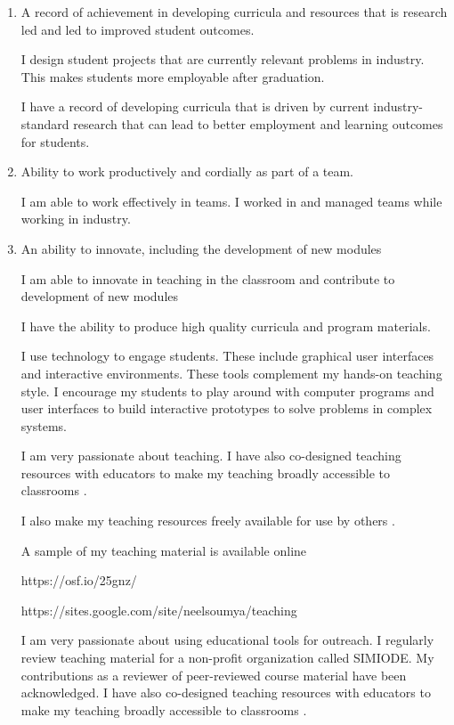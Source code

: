 \documentclass[10pt]{article}
\begin{document}
\begin{enumerate}
\item A record of achievement in developing
curricula and resources that is research led and
led to improved student outcomes.

I design student projects that are currently relevant problems in industry. This makes students more employable after graduation.

I have a record of developing curricula that is driven by current industry-standard research that can lead to better employment and learning outcomes for students.



\item Ability to work productively and cordially as part of a team.

I am able to work effectively in teams. I worked in and managed teams while working in industry.


\item An ability to innovate, including the development of new modules

I am able to innovate in teaching in the classroom and contribute to development of new modules


I have the ability to produce high quality curricula and program materials.

I use technology to engage students. These include graphical user interfaces and interactive
environments. These tools complement my hands-on teaching style. I encourage my students to
play around with computer programs and user interfaces to build interactive prototypes to solve
problems in complex systems.



I am very passionate about teaching. 
I have also co-designed teaching resources with educators to make my teaching broadly
accessible to classrooms \cite{Banerjee2019a}.

I also make my teaching resources freely available for use by others \cite{Banerjee2019a}.

A sample of my teaching material is available online 

https://osf.io/25gnz/

https://sites.google.com/site/neelsoumya/teaching


I am very passionate about using educational tools for outreach. I regularly review teaching
material for a non-profit organization called SIMIODE. My contributions as a reviewer of peer-reviewed
course material have been acknowledged.
I have also co-designed teaching resources with educators to make my teaching broadly
accessible to classrooms \cite{Banerjee2019a}.


\end{enumerate}
\end{document}
